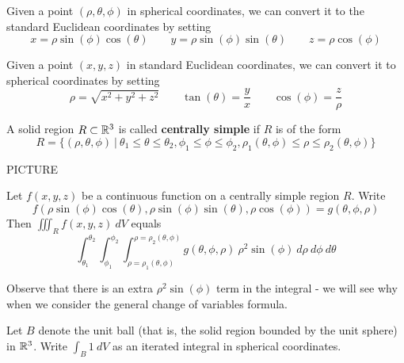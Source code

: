 \begin{proposition}
    Given a point $(\rho,\theta,\phi)$ in spherical coordinates, we can convert it to the standard Euclidean coordinates by setting 
    $$x = \rho\sin(\phi)\cos(\theta) \qquad y = \rho\sin(\phi)\sin(\theta) \qquad z=\rho\cos(\phi)$$
    \end{proposition}
    
    \begin{proposition}
    Given a point $(x,y,z)$ in standard Euclidean coordinates, we can convert it to spherical coordinates by setting 
    $$\rho = \sqrt{x^2 + y^2 +z^2} \qquad \tan(\theta) = \frac{y}{x} \qquad \cos(\phi) = \frac{z}{\rho}$$
    \end{proposition}

\begin{definition}
A solid region $R \subset \mathbb{R}^3$ is called \textbf{centrally simple} if $R$ is of the form
$$R = \{ (\rho, \theta, \phi) \ | \ \theta_1 \leq \theta \leq \theta_2, \phi_1 \leq \phi \leq \phi_2, \rho_1(\theta,\phi) \leq \rho \leq \rho_2(\theta,\phi)\}$$
\end{definition}

\begin{example}
    PICTURE
\end{example}

\begin{theorem}
Let $f(x,y,z)$ be a continuous function on a centrally simple region $R$. Write $$f(\rho\sin(\phi)\cos(\theta),\rho\sin(\phi)\sin(\theta),\rho\cos(\phi)) = g(\theta, \phi, \rho)$$  Then $\iiint_R f(x,y,z) \ dV$ equals
$$\int_{\theta_1}^{\theta_2} \int_{\phi_1}^{\phi_2}\int_{\rho = \rho_1(\theta,\phi)}^{\rho = \rho_2(\theta,\phi)} g(\theta, \phi, \rho) \ \rho^2 \sin(\phi) \ d\rho \ d\phi \ d\theta$$
\end{theorem}

\begin{remark}
    Observe that there is an extra $\rho^2 \sin(\phi)$ term in the integral - we will see why when we consider the general change of variables formula.
\end{remark}

\begin{example}
    Let $B$ denote the unit ball (that is, the solid region bounded by the unit sphere) in $\mathbb{R}^3$.  Write $\int_B 1 \ dV$ as an iterated integral in spherical coordinates. 
\end{example}




